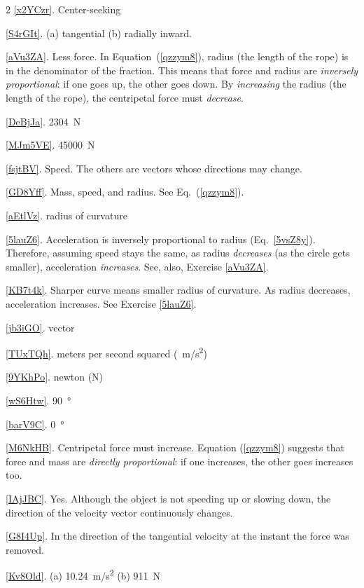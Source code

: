 \documentclass[main.tex]{subfiles}
\begin{document}
\begin{multicols}{2}
\ref{x2YCzr}. Center-seeking

\ref{S4rGIt}. (a) tangential \hspace{1em} (b) radially inward.

\ref{aVu3ZA}. Less force. In Equation~(\ref{qzzym8}), radius (the length of the rope) is in the denominator of the fraction. This means that force and radius are \textit{inversely proportional}: if one goes up, the other goes down. By \textit{increasing} the radius (the length of the rope), the centripetal force must \textit{decrease}.

\ref{DeBjJa}. \SI{2304}{N}

\ref{MJm5VE}. \SI{45000}{N}

\ref{fsjtBV}. Speed. The others are vectors whose directions may change.

\ref{GD8Yff}. Mass, speed, and radius. See Eq.~(\ref{qzzym8}).

\ref{aEtlVz}. radius of curvature

\ref{5lauZ6}. Acceleration is inversely proportional to radius (Eq.~\ref{5vsZ8y}). Therefore, assuming speed stays the same, as radius \textit{decreases} (as the circle gets smaller), acceleration \textit{increases}. See, also, Exercise \ref{aVu3ZA}.

\ref{KB7t4k}. Sharper curve means smaller radius of curvature. As radius decreases, acceleration increases. See Exercise \ref{5lauZ6}.

\ref{jb3iGO}. vector

\ref{TUxTQh}. meters per second squared (\SI{}{m/s^2})

\ref{9YKhPo}. newton (N)

\ref{wS6Htw}. \SI{90}{\degree}

\ref{barV9C}. \SI{0}{\degree}

\ref{M6NkHB}. Centripetal force must increase. Equation (\ref{qzzym8}) suggests that force and mass are \textit{directly proportional}: if one increases, the other goes increases too. 

\ref{IAjJBC}. Yes. Although the object is not speeding up or slowing down, the direction of the velocity vector continuously changes. 

\ref{G8I4Up}. In the direction of the tangential velocity at the instant the force was removed.

\ref{Kv8Old}. (a) \SI{10.24}{m/s^2} \hspace{1em} (b) \SI{911}{N}


\end{multicols}
\end{document}

